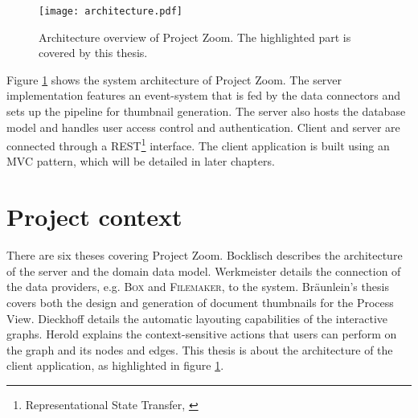\begin{figure}
\begin{center}
\texttt{[image: architecture.pdf]}
\caption{Architecture overview of Project Zoom. The highlighted part is covered by this thesis.}
\label{fig:CompleteArchitectureDiagram}
\end{center}
\end{figure}

Figure \ref{fig:CompleteArchitectureDiagram} shows the system architecture of Project Zoom. The server implementation features an event-system that is fed by the data connectors and sets up the pipeline for thumbnail generation. The server also hosts the database model and handles user access control and authentication. Client and server are connected through a REST\footnote{Representational State Transfer, \cite{Fielding_2000}} interface. The client application is built using an MVC pattern, which will be detailed in later chapters. 

\section{Project context}
There are six theses covering Project Zoom. Bocklisch \cite{Bocklisch_2013} describes the architecture of the server and the domain data model. Werkmeister \cite{Werkmeister_2013} details the connection of the data pro\-vi\-ders, e.g. \textsc{Box} and \textsc{Filemaker}, to the system. Bräunlein's thesis \cite{Braeunlein_2013} covers both the design and generation of document thumbnails for the Process View. Dieckhoff \cite{Dieckhoff_2013} details the automatic layouting capabilities of the interactive graphs. Herold \cite{Herold_2013} explains the context-sensitive actions that users can perform on the graph and its nodes and edges. This thesis is about the architecture of the client application, as highlighted in figure \ref{fig:CompleteArchitectureDiagram}.

